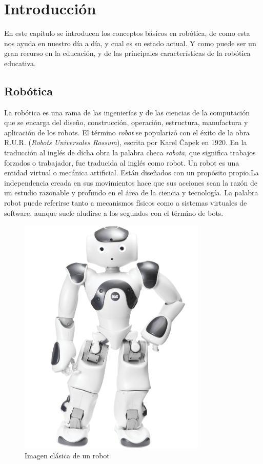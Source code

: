 \chapter{Introducción}
\label{chap:intro}
En este capítulo se introducen los conceptos básicos en robótica, de como esta nos ayuda en nuestro día a día, y cual es su estado actual. Y como puede ser un gran recurso en la educación, y de las principales características de la robótica educativa.

\section{Robótica}
\label{sec:robotica}
La robótica es una rama de las ingenierías y de las ciencias de la computación que se encarga del diseño, construcción, operación, estructura, manufactura y aplicación de los robots.
El término \textit{robot} se popularizó con el éxito de la obra R.U.R. (\textit{Robots Universales Rossum}), escrita por Karel Čapek en 1920. En la traducción al inglés de dicha obra la palabra checa \textit{robota}, que significa trabajos forzados o trabajador, fue traducida al inglés como robot.
Un robot es una entidad virtual o mecánica artificial. Están diseñados con un propósito propio.La independencia creada en sus movimientos hace que sus acciones sean la razón de un estudio razonable y profundo en el área de la ciencia y tecnología. La palabra robot puede referirse tanto a mecanismos físicos como a sistemas virtuales de software, aunque suele aludirse a los segundos con el término de bots.

    \begin{figure}[H]
    \centering
    \includegraphics[width=0.8\textwidth]{img/robot.png}
    \caption{Imagen clásica de un robot} \label{fig:robot}
    \end{figure}

